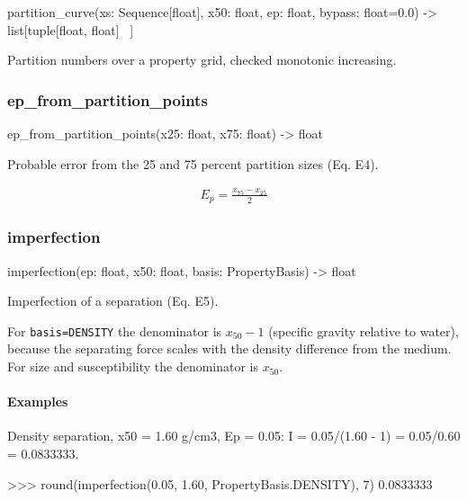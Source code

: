 \documentclass[10pt,a4paper,twoside]{report}
\begin{document}
\begin{verbatimsmall}
partition_curve(xs: Sequence[float], x50: float, ep: float, bypass: float=0.0) -> list[tuple[float, float]
    \ ]
\end{verbatimsmall}

Partition numbers over a property grid, checked monotonic increasing.

\subsubsection*{ep\_from\_partition\_points}

\begin{verbatimsmall}
ep_from_partition_points(x25: float, x75: float) -> float
\end{verbatimsmall}

Probable error from the 25 and 75 percent partition sizes (Eq. E4).

\begin{equation*}
\begin{gathered}
E_p = \frac{x_{75} - x_{25}}{2}
\end{gathered}
\end{equation*}

\subsubsection*{imperfection}

\begin{verbatimsmall}
imperfection(ep: float, x50: float, basis: PropertyBasis) -> float
\end{verbatimsmall}

Imperfection of a separation (Eq. E5).

For \texttt{basis=DENSITY} the denominator is $x_{50} - 1$ (specific gravity relative to water), because the separating force scales with the density difference from the medium. For size and susceptibility the denominator is $x_{50}$.

\paragraph*{Examples}

Density separation, x50 = 1.60 g/cm3, Ep = 0.05: I = 0.05/(1.60 - 1) = 0.05/0.60 = 0.0833333.

\begin{doctestblock}
>>> round(imperfection(0.05, 1.60, PropertyBasis.DENSITY), 7)
0.0833333
\end{doctestblock}
\end{document}

